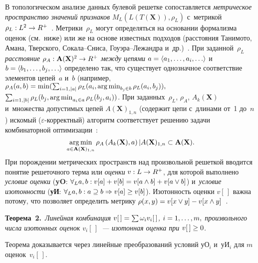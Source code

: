 \begin{multicols}{2}
     В топологическом анализе данных булевой решетке   
со\-по\-став\-ля\-ет\-ся \textit{мет\-ри\-че\-ское пространство значений при\-зна\-ков} 
$M_L(L(T(\mathbf{X})), \rho_L)$ с~мет\-ри\-кой $\rho_L: L^2\hm\to 
R^+$~\cite{2-tor}. Метрики~$\rho_L$ могут определяться на основании 
формализма оценок (см.\ ниже) или же на основе известных подходов 
(расстояния Танимото, Амана, Твер\-ско\-го, Со\-ка\-ла--Сни\-са,\linebreak  
Гоу\-эра--Ле\-жанд\-ра и~др.)~\cite{6-tor}. При заданной~$\rho_L$ 
\textit{расстояние} $\rho_A: \mathbf{A}(\mathbf{X})^2\hm\to R^+$ 
\textit{меж\-ду цепями} $a\hm= \langle a_1, \ldots , a_i,\ldots\rangle$ и~$b\hm= 
\langle b_1, \ldots , b_j,\ldots\rangle$ определено так, что существует 
однозначное соответствие элементов цепей~$a$ и~$b$ (например, 
$\rho_A(a,b)\hm= \min ( \sum_{i=1,\vert a\vert} \rho_L(a_i, \argmin_{b_j\in b} 
\rho_L(a_i, b_j)),$\linebreak $\sum_{i=1,\vert b\vert} \rho_L(b_j, \mathop{\mathrm{arg}\,\mathrm{min}}_{a_i\in a} \rho_L 
(b_j, a_i))$. При заданных~$\rho_L$, $\rho_A$, $A_k(\mathbf{X})$ 
и~множества до\-пус\-ти\-мых цепей $A(\mathbf{X})_{1,n}$ (содержит цепи 
с~длинами от~1 до~$n$) иско\-мый ($\varepsilon$-кор\-рект\-ный) алгоритм 
со\-от\-вет\-ст\-ву\-ет решению задачи комбинаторной оптимизации~\cite{5-tor}: $$
    \argmin\limits_{a\in \mathbf{A}(\mathbf{X})_{1,n}} \rho_A \left( 
A_k(\mathbf{X}), a\right)\vert A(\mathbf{X})_{1,n}\hm\subset 
\mathbf{A}(\mathbf{X}).
     $$
При порождении мет\-ри\-че\-ских пространств над произвольной решеткой   
вводится понятие решеточного тер\-ма или \textit{оценки} $v: L\hm\to R^+$, 
для которой выполнено \textit{условие оценки} (\textbf{yO}: $\forall_L a,b: 
v[a]\hm+v[b]\hm= v[a\wedge b]\hm+ v[a\vee b]$) и~\textit{условие 
изотонности} (\textbf{уИ}: $\forall_L a,b: a\hm\supseteq b \hm \Rightarrow 
v[a]\hm\geq v[b]$). Изо\-тон\-ность оцен\-ки $v[\,]$ важ\-на потому, что поз\-во\-ля\-ет 
определить мет\-ри\-ку $\rho(x,y) \hm= v[x\vee y] \hm- v[x\wedge y]$~\cite{2-tor}.

\smallskip

\noindent
\textbf{Теорема~2.}\ \textit{Линейная комбинация $v[\,]\hm= \sum \omega_i 
v_i[\,]$, $i\hm=1, \ldots, m,$ произвольного чис\-ла изотонных  
оценок $v_i[\,]$~--- изотонная оцен\-ка при $v[\,]\hm\geq0$.}

\smallskip
 
     Теорема доказывается через линейные преобразований условий уО$_i$ 
и~уИ$_i$ для $m$ оценок~$v_i[\,]$.
     
     
     \smallskip
     

\end{multicols}
